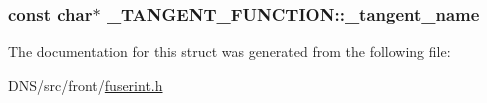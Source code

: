 \subsubsection[{\texorpdfstring{\+\_\+tangent\+\_\+name}{_tangent_name}}]{\setlength{\rightskip}{0pt plus 5cm}const char$\ast$ \+\_\+\+T\+A\+N\+G\+E\+N\+T\+\_\+\+F\+U\+N\+C\+T\+I\+O\+N\+::\+\_\+tangent\+\_\+name}\hypertarget{struct___t_a_n_g_e_n_t___f_u_n_c_t_i_o_n_a71d75595b59e6ebe0f3972d4e1570afc}{}\label{struct___t_a_n_g_e_n_t___f_u_n_c_t_i_o_n_a71d75595b59e6ebe0f3972d4e1570afc}


The documentation for this struct was generated from the following file\+:\begin{DoxyCompactItemize}
\item 
D\+N\+S/src/front/\hyperlink{fuserint_8h}{fuserint.\+h}\end{DoxyCompactItemize}
